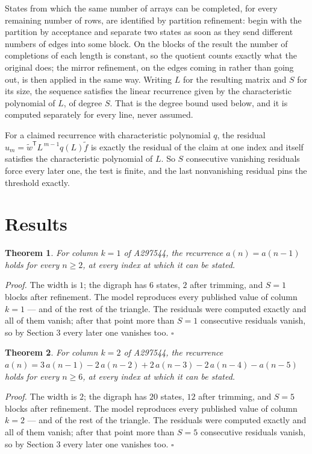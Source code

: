 \documentclass[11pt]{article}
\newtheorem{theorem}{Theorem}
\theoremstyle{definition}
\begin{document}
States from which the same number of arrays can be completed, for every remaining number of rows, are identified by partition refinement: begin with the partition by acceptance and separate two states as soon as they send different numbers of edges into some block. On the blocks of the result the number of completions of each length is constant, so the quotient counts exactly what the original does; the mirror refinement, on the edges coming in rather than going out, is then applied in the same way. Writing $L$ for the resulting matrix and $S$ for its size, the sequence satisfies the linear recurrence given by the characteristic polynomial of $L$, of degree $S$. That is the degree bound used below, and it is computed separately for every line, never assumed.

For a claimed recurrence with characteristic polynomial $q$, the residual $u_m = \tilde w^{\mathsf T}L^{\,m-1}q(L)\tilde f$ is exactly the residual of the claim at one index and itself satisfies the characteristic polynomial of $L$. So $S$ consecutive vanishing residuals force every later one, the test is finite, and the last nonvanishing residual pins the threshold exactly.

\section{Results}

\begin{theorem} For column $k = 1$ of A297544, the recurrence $a(n) = a(n-1)$ holds for every $n \ge 2$, at every index at which it can be stated.\end{theorem}

{\itshape Proof.} The width is $1$; the digraph has $6$ states, $2$ after trimming, and $S = 1$ blocks after refinement. The model reproduces every published value of column $k = 1$ --- and of the rest of the triangle. The residuals were computed exactly and all of them vanish; after that point more than $S = 1$ consecutive residuals vanish, so by Section 3 every later one vanishes too. $\square$

\begin{theorem} For column $k = 2$ of A297544, the recurrence $a(n) = 3\,a(n-1) - 2\,a(n-2) + 2\,a(n-3) - 2\,a(n-4) - a(n-5)$ holds for every $n \ge 6$, at every index at which it can be stated.\end{theorem}

{\itshape Proof.} The width is $2$; the digraph has $20$ states, $12$ after trimming, and $S = 5$ blocks after refinement. The model reproduces every published value of column $k = 2$ --- and of the rest of the triangle. The residuals were computed exactly and all of them vanish; after that point more than $S = 5$ consecutive residuals vanish, so by Section 3 every later one vanishes too. $\square$
\end{document}
